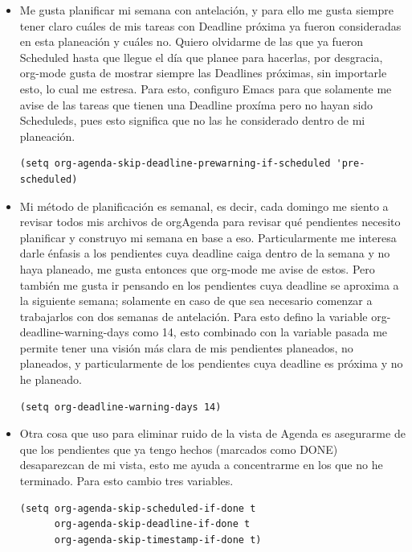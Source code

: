 \documentclass[11pt]{article}
\begin{document}
\begin{itemize}
\item Me gusta planificar mi semana con antelación, y para ello me gusta siempre tener claro cuáles de mis tareas con Deadline próxima ya fueron consideradas en esta planeación y cuáles no. Quiero olvidarme de las que ya fueron Scheduled hasta que llegue el día que planee para hacerlas, por desgracia, org-mode gusta de mostrar siempre las Deadlines próximas, sin importarle esto, lo cual me estresa. Para esto, configuro Emacs para que solamente me avise de las tareas que tienen una Deadline proxíma pero no hayan sido Scheduleds, pues esto significa que no las he considerado dentro de mi planeación.

\begin{verbatim}
(setq org-agenda-skip-deadline-prewarning-if-scheduled 'pre-scheduled)
\end{verbatim}

\item Mi método de planificación es semanal, es decir, cada domingo me siento a revisar todos mis archivos de orgAgenda para revisar qué pendientes necesito planificar y construyo mi semana en base a eso. Particularmente me interesa darle énfasis a los pendientes cuya deadline caiga dentro de la semana y no haya planeado, me gusta entonces que org-mode me avise de estos. Pero también me gusta ir pensando en los pendientes cuya deadline se aproxima a la siguiente semana; solamente en caso de que sea necesario comenzar a trabajarlos con dos semanas de antelación. Para esto defino la variable org-deadline-warning-days como 14, esto combinado con la variable pasada me permite tener una visión más clara de mis pendientes planeados, no planeados, y particularmente de los pendientes cuya deadline es próxima y no he planeado.

\begin{verbatim}
(setq org-deadline-warning-days 14)
\end{verbatim}

\item Otra cosa que uso para eliminar ruido de la vista de Agenda es asegurarme de que los pendientes que ya tengo hechos (marcados como DONE) desaparezcan de mi vista, esto me ayuda a concentrarme en los que no he terminado. Para esto cambio tres variables.

\begin{verbatim}
(setq org-agenda-skip-scheduled-if-done t
      org-agenda-skip-deadline-if-done t
      org-agenda-skip-timestamp-if-done t)
\end{verbatim}
\end{itemize}
\end{document}
